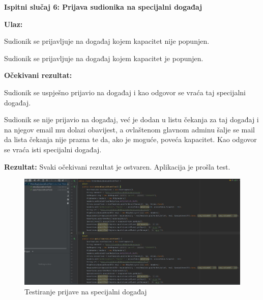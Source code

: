    
   			\textbf{Ispitni slučaj 6: Prijava sudionika na specijalni događaj \newline}
   
   \textbf{Ulaz:}
   \begin{packed_item}
   \item[] \begin{packed_enum}
				
				\item Sudionik se prijavljuje na događaj kojem kapacitet nije popunjen.
    \item Sudionik se prijavljuje na događaj kojem kapacitet je popunjen.
				
			\end{packed_enum}
   \end{packed_item}

   \textbf{Očekivani rezultat:}
   \begin{packed_item}
   \item[] \begin{packed_enum}
				
				\item Sudionik se uspješno prijavio na događaj i kao odgovor se vraća taj  specijalni događaj.
    \item  Sudionik se nije prijavio na događaj, već je dodan u listu čekanja za taj događaj i na njegov email mu dolazi obavijest, a ovlaštenom glavnom adminu šalje se mail da lista čekanja nije prazna te da, ako je moguće, poveća kapacitet. Kao odgovor se vraća isti specijalni događaj.
				
			\end{packed_enum}
   \end{packed_item}
   \textbf{Rezultat:} \text Svaki očekivani rezultat je ostvaren. \color{red} Aplikacija je prošla test. \color{black}

    \begin{figure}[H]
            \includegraphics[scale=0.45]{slike/ApplyAttendSpecialEventTest.JPG} %
			
			\centering
			\caption{Testiranje prijave na specijalni događaj}
			\label{fig:testiranje prijave na specijalni događaj}
			\end{figure}

